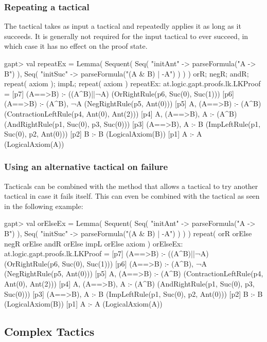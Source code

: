 \documentclass{article}
\newcommand{\cli}[1]{{\ttfamily {#1}}}
\begin{document}
\subsubsection*{Repeating a tactical}
The \cli{repeat} tactical takes as input a tactical and repeatedly applies it as long as it succeeds. It is generally not required for the input tactical to ever succeed, in which case it has no effect on the proof state.

\begin{clilisting}
gapt> val repeatEx = Lemma( Sequent( Seq( "initAnt" -> parseFormula("A -> B") ), Seq( "initSuc" -> parseFormula("(A & B) | -A") ) ) ) { orR; negR; andR; repeat( axiom ); impL; repeat( axiom ) }
repeatEx: at.logic.gapt.proofs.lk.LKProof =
[p7] (A==>B) :- ((A^B)||¬A)    (OrRightRule(p6, Suc(0), Suc(1)))
[p6] (A==>B) :- (A^B), ¬A    (NegRightRule(p5, Ant(0)))
[p5] A, (A==>B) :- (A^B)    (ContractionLeftRule(p4, Ant(0), Ant(2)))
[p4] A, (A==>B), A :- (A^B)    (AndRightRule(p1, Suc(0), p3, Suc(0)))
[p3] (A==>B), A :- B    (ImpLeftRule(p1, Suc(0), p2, Ant(0)))
[p2] B :- B    (LogicalAxiom(B))
[p1] A :- A    (LogicalAxiom(A))
\end{clilisting}

\subsubsection*{Using an alternative tactical on failure}
Tacticals can be combined with the \cli{orElse} method that allows a tactical to try another tactical in case it fails itself. This can even be combined with the \cli{repeat} tactical as seen in the following example:

\begin{clilisting}
gapt> val orElseEx = Lemma( Sequent( Seq( "initAnt" -> parseFormula("A -> B") ), Seq( "initSuc" -> parseFormula("(A & B) | -A") ) ) ) { repeat( orR orElse negR orElse andR orElse impL orElse axiom ) }
orElseEx: at.logic.gapt.proofs.lk.LKProof =
[p7] (A==>B) :- ((A^B)||¬A)    (OrRightRule(p6, Suc(0), Suc(1)))
[p6] (A==>B) :- (A^B), ¬A    (NegRightRule(p5, Ant(0)))
[p5] A, (A==>B) :- (A^B)    (ContractionLeftRule(p4, Ant(0), Ant(2)))
[p4] A, (A==>B), A :- (A^B)    (AndRightRule(p1, Suc(0), p3, Suc(0)))
[p3] (A==>B), A :- B    (ImpLeftRule(p1, Suc(0), p2, Ant(0)))
[p2] B :- B    (LogicalAxiom(B))
[p1] A :- A    (LogicalAxiom(A))
\end{clilisting}

\subsection{Complex Tactics}
\end{document}
